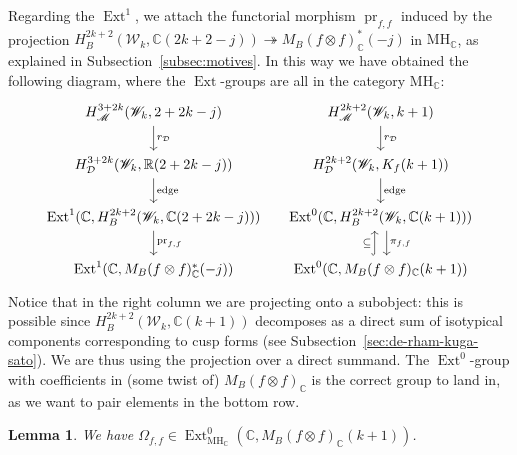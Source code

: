 \documentclass[11pt, a4paper, reqno]{amsart}
\theoremstyle{definition}
\theoremstyle{plain}
\newtheorem{lemma}[definition]{Lemma}
\theoremstyle{remark}
\DeclareMathOperator{\Ext}{Ext}
\DeclareMathOperator{\mot}{\mathscr{M}}
\DeclareMathOperator{\pr}{pr}
\newcommand{\numberset}{\mathbb}
\newcommand{\C}{\numberset{C}}
\newcommand{\R}{\numberset{R}}
\newcommand{\KS}{\mathscr{W}}
\newcommand{\MH}{\mathrm{MH}}
\newcommand{\del}{\mathcal{D}}
\newcommand{\regulator}[1]{r_{#1}}
\newcommand{\rD}{\regulator{\del}}
\begin{document}
Regarding the $\Ext^1$, we attach the functorial morphism $\pr_{f,f}$ induced by the projection $H^{2k+2}_B(\KS_k, \C(2k+2-j)) \twoheadrightarrow M_B(f\otimes f)_\C^*(-j)$ in $\MH_\C$, as explained in Subsection~\ref{subsec:motives}. In this way we have obtained the following diagram, where the $\Ext$-groups are all in the category $\MH_\C$:
\begin{equation}
    \label{diag:complex-ext}
    \begin{tikzcd}[column sep=small]
        H_{\mot}^{3+2k}(\KS_k,2+2k-j) \arrow["\rD"]{d} & H_{\mot}^{2k+2}(\KS_k,k+1) \arrow["\rD"]{d} \\
        H_{\del}^{3+2k}(\KS_k, \R(2+2k-j)) \arrow["\mathrm{edge}"]{d} & H_{\del}^{2k+2}(\KS_k,K_f(k+1)) \arrow["\text{edge}"]{d} \\
        \Ext^1(\C,H^{2k+2}_B(\KS_k, \C(2+2k-j))) \arrow["\pr_{f,f}"]{d} & \Ext^0(\C,H_B^{2k+2}(\KS_k, \C(k+1))) \arrow[shift left=1ex,"\pi_{f,f}"]{d} \\
         \Ext^1(\C,M_B(f\otimes f)_{\C}^*(-j)) & \Ext^0(\C,M_B(f\otimes f)_\C(k+1)) \arrow[shift left=1ex,"\subseteq",hook]{u}
    \end{tikzcd}
\end{equation}
Notice that in the right column we are projecting onto a subobject: this is possible since $H^{2k+2}_B(\KS_k, \C(k+1))$ decomposes as a direct sum of isotypical components corresponding to cusp forms (see Subsection~\ref{sec:de-rham-kuga-sato}). We are thus using the projection over a direct summand. The $\Ext^0$-group with coefficients in (some twist of) $M_B(f\otimes f)_\C$ is the correct group to land in, as we want to pair elements in the bottom row.



  \begin{lemma}
   We have $\Omega_{f,f} \in \Ext^0_{\MH_\C}(\C, M_B(f\otimes f)_\C(k+1))$.
  \end{lemma}
  
\end{document}
